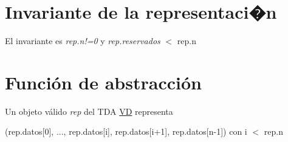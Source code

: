 \hypertarget{repVector_invVector}{}\section{Invariante de la representaci�n}\label{repVector_invVector}
El invariante es {\itshape rep.\+n!=0} y {\itshape rep.\+reservados} $<$ rep.\+n\hypertarget{repVector_faVector}{}\section{Función de abstracción}\label{repVector_faVector}
Un objeto válido {\itshape rep} del T\+DA \hyperlink{classVD}{VD} representa

(rep.\+datos\mbox{[}0\mbox{]}, ..., rep.\+datos\mbox{[}i\mbox{]}, rep.\+datos\mbox{[}i+1\mbox{]}, rep.\+datos\mbox{[}n-\/1\mbox{]}) con i $<$ rep.\+n 